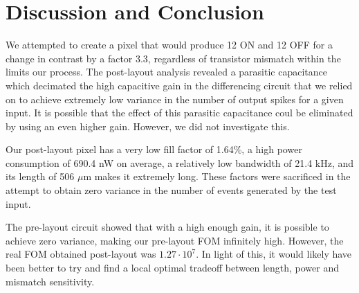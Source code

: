 \section{Discussion and Conclusion}
We attempted to create a pixel that would produce 12 ON and 12 OFF for a change in contrast by a factor 3.3, regardless
of transistor mismatch within the limits our process. The post-layout analysis revealed a parasitic capacitance
which decimated the high capacitive gain in the differencing circuit that we relied on to achieve extremely low
variance in the number of output spikes for a given input. It is possible that the effect of this parasitic capacitance
coul be eliminated by using an even higher gain. However, we did not investigate this.

Our post-layout pixel has a very low fill factor of 1.64\%, a high power consumption of 690.4 nW on average, a
relatively low bandwidth of 21.4 kHz, and its length of 506 \(\mu\)m makes it extremely long. 
These factors were sacrificed in the attempt to obtain zero variance in the number of events generated by the 
test input.

The pre-layout circuit showed that with a high enough gain, it is possible to achieve zero variance, making our
pre-layout FOM infinitely high. However, the real FOM obtained post-layout was \(1.27\cdot10^7\). 
In light of this, it would likely have been better to try and find a local optimal tradeoff between length, power and
mismatch sensitivity.
